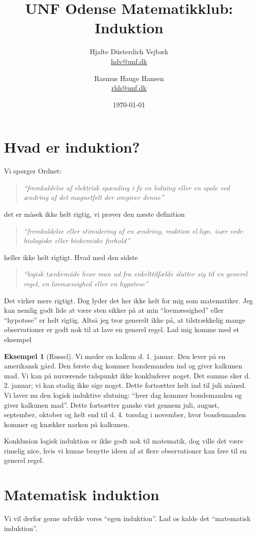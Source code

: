 \documentclass{article}
\numberwithin{equation}{section}
\theoremstyle{plain}
\theoremstyle{definition}
\newtheorem{eksempel}[saetning]{Eksempel}
\begin{document}
\title{UNF Odense Matematikklub: Induktion}
\author{Hjalte Düsterdich Vejbæk\\ \href{mailto:hdv@unf.dk}{hdv@unf.dk}\and Rasmus Hauge Hansen\\ \href{mailto:rhh@unf.dk}{rhh@unf.dk}}
\date{\today}
\maketitle{}
\thispagestyle{empty}

\newpage

\section{Hvad er induktion?}
    Vi spørger Ordnet:
    \begin{quote}
        \textit{``fremkaldelse af elektrisk spænding i fx en ledning eller en spole ved ændring af det magnetfelt der omgiver denne''}
    \end{quote}
    det er måsek ikke helt rigtig, vi prøver den næste definition
    \begin{quote}
        \textit{``fremkaldelse eller stimulering af en ændring, reaktion el.lign. især vedr. biologiske eller biokemiske forhold''}
    \end{quote}
    heller ikke helt rigtigt. Hvad med den sidste
    \begin{quote}
        \textit{``logisk tænkemåde hvor man ud fra enkelttilfælde slutter sig til en generel regel, en lovmæssighed eller en hypotese''}
    \end{quote}
    Det virker mere rigtigt. Dog lyder det her ikke helt for mig som matematiker. Jeg kan nemlig godt lide at være sten sikker på at min ``lovmæssighed'' eller ``hypotese'' er helt rigtig. Altså jeg tror generelt ikke på, at tilstrækkelig mange observationer er godt nok til at lave en generel regel. Lad mig komme med et eksempel
    \begin{eksempel}[Russel]
        Vi møder en kalkun d. 1. januar. Den lever på en amerikansk gård. Den første dag kommer bondemanden ind og giver kalkunen mad. Vi kan på nuværende tidspunkt ikke konkluderer noget. Det samme sker d. 2. januar; vi kan stadig ikke sige noget. Dette fortsætter helt ind til juli måned. Vi laver nu den logisk induktive slutning: ``hver dag kommer bondemanden og giver kalkunen mad''. Dette fortsætter ganske vist gennem juli, august, september, oktober og helt end til d. 4. torsdag i november, hvor bondemanden kommer og knækker narken på kalkunen.
    \end{eksempel}
    Konklusion logisk induktion er ikke godt nok til matematik, dog ville det være rimelig nice, hvis vi kunne benytte ideen af at flere observationer kan føre til en generel regel.
    
\section{Matematisk induktion}
    Vi vil derfor gerne udvikle vores ``egen induktion''. Lad os kalde det ``matematisk induktion''.
\end{document}
